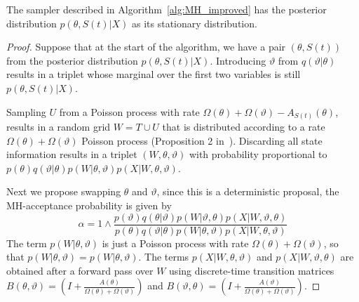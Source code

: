 \begin{proposition}
  The sampler described in Algorithm~\ref{alg:MH_improved} has the posterior
  distribution $p(\theta,S(t)|X)$ as its stationary distribution.
\end{proposition}
\begin{proof}
  Suppose that at the start of the algorithm, we have a pair $(\theta,S(t))$ from
  the posterior distribution $p(\theta,S(t)|X)$. Introducing $\vartheta$
  from $q(\vartheta|\theta)$ results in a triplet whose marginal over the first
  two variables is still $p(\theta,S(t)|X)$.

  Sampling $U$ from a Poisson process with rate $\Omega(\theta) +
  \Omega(\vartheta) - A_{S(t)}(\theta)$, results in a random grid $W = T \cup U$
  that is distributed according to a rate $\Omega(\theta) + \Omega(\vartheta)$
  Poisson process (Proposition 2 in~\cite{RaoTeh13}). Discarding all state 
  information results in a triplet $(W,\theta,\vartheta)$ with probability
  proportional to $p(\theta)q(\vartheta|\theta)p(W|\theta,\vartheta)
  p(X|W,\theta,\vartheta)$.

Next we propose swapping $\theta$ and $\vartheta$, since this
is a deterministic proposal, the MH-acceptance probability is given by
$$\alpha = 1 \wedge \frac{p(\vartheta)q(\theta|\vartheta)p(W|\vartheta,\theta)
p(X|W,\vartheta,\theta)}{p(\theta)q(\vartheta|\theta)p(W|\theta,\vartheta)
p(X|W,\theta,\vartheta)}$$
The term $p(W|\theta,\vartheta)$ is just a Poisson process with rate $\Omega(\theta)+
\Omega(\vartheta)$, so that $p(W|\theta,\vartheta) = p(W|\theta,\vartheta)$. The
terms $p(X|W,\theta,\vartheta)$ and $p(X|W,\vartheta,\theta)$ are obtained
after a forward pass over $W$ using discrete-time transition matrices
$B(\theta,\vartheta) = \left(I + \frac{A(\theta)}{\Omega(\theta)+\Omega(\vartheta)}\right)$ 
and $B(\vartheta,\theta) = \left(I + \frac{A(\vartheta)}{\Omega(\theta)+\Omega(\vartheta)}\right)$. 


\end{proof}
